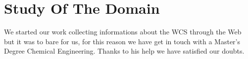 \chapter{\textbf{Study Of The Domain}}
We started our work collecting informations about the WCS through the Web but it was to bare for us, for this reason we have get in touch with a Master’s Degree Chemical Engineering. Thanks to his help we have satisfied our doubts.
